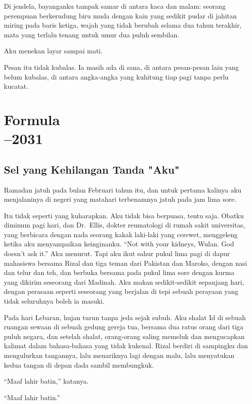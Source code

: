\documentclass[11pt,twoside,openany]{book}
\begin{document}
Di jendela, bayanganku tampak samar di antara kaca dan malam: seorang perempuan berkerudung biru muda dengan kain yang sedikit pudar di jahitan miring pada baris ketiga, wajah yang tidak berubah selama dua tahun terakhir, mata yang terlalu tenang untuk umur dua puluh sembilan.

Aku menekan layar sampai mati.

Pesan itu tidak kubalas. Ia masih ada di sana, di antara pesan-pesan lain yang belum kubalas, di antara angka-angka yang kuhitung tiap pagi tanpa perlu kucatat.

\part[Formula]{Formula\\[0.7em]\normalsize{}--2031}
\chapter{Sel yang Kehilangan Tanda "Aku"}
Ramadan jatuh pada bulan Februari tahun itu, dan untuk pertama kalinya aku menjalaninya di negeri yang matahari terbenamnya jatuh pada jam lima sore.

Itu tidak seperti yang kuharapkan. Aku tidak bisa berpuasa, tentu saja. Obatku diminum pagi hari, dan Dr.~Ellis, dokter reumatologi di rumah sakit universitas, yang berbicara dengan nada seorang kakak laki-laki yang cerewet, menggeleng ketika aku menyampaikan keinginanku. ``Not with your kidneys, Wulan. God doesn't ask it.'' Aku menurut. Tapi aku ikut sahur pukul lima pagi di dapur mahasiswa bersama Rizal dan tiga teman dari Pakistan dan Maroko, dengan nasi dan telur dan teh, dan berbuka bersama pada pukul lima sore dengan kurma yang dikirim seseorang dari Madinah. Aku makan sedikit-sedikit sepanjang hari, dengan perasaan seperti seseorang yang berjalan di tepi sebuah perayaan yang tidak seluruhnya boleh ia masuki.

Pada hari Lebaran, hujan turun tanpa jeda sejak subuh. Aku shalat Id di sebuah ruangan sewaan di sebuah gedung gereja tua, bersama dua ratus orang dari tiga puluh negara, dan setelah shalat, orang-orang saling memeluk dan mengucapkan kalimat dalam bahasa-bahasa yang tidak kukenal. Rizal berdiri di sampingku dan mengulurkan tangannya, lalu menariknya lagi dengan malu, lalu menyatukan kedua tangan di depan dada sambil membungkuk.

``Maaf lahir batin,'' katanya.

``Maaf lahir batin.''
\end{document}
